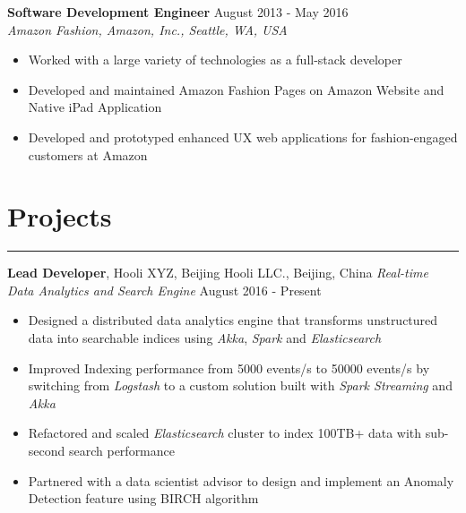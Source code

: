 \documentclass[line]{res} %
\begin{document}
\begin{resume}
    \textbf{Software Development Engineer}
    \hfill August 2013 - May 2016 \\
    \textit{Amazon Fashion, Amazon, Inc., Seattle, WA, USA}
    \begin{itemize} \itemsep -2pt  %
      \item Worked with a large variety of technologies as a full-stack developer
      \item Developed and maintained Amazon Fashion Pages on Amazon Website and Native iPad Application
      \item Developed and prototyped enhanced UX web applications for fashion-engaged customers at Amazon
    \end{itemize}


  \section{Projects}
  \rule{\textwidth}{1pt}
    \textbf{Lead Developer}, Hooli XYZ, Beijing Hooli LLC., Beijing, China
    \textit{Real-time Data Analytics and Search Engine}
    \hfill August 2016 - Present \\
    \begin{itemize} \itemsep -2pt
      \item Designed a distributed data analytics engine that transforms unstructured data into searchable 
      indices using \textit{Akka}, \textit{Spark} and \textit{Elasticsearch}
      \item Improved Indexing performance from 5000 events/s to 50000 events/s by switching from \textit{Logstash}
      to a custom solution built with \textit{Spark Streaming} and \textit{Akka}
      \item Refactored and scaled \textit{Elasticsearch} cluster to index 100TB+ data with sub-second search performance
      \item Partnered with a data scientist advisor to design and implement an Anomaly Detection feature using BIRCH algorithm
    \end{itemize}
    


\end{resume}
\end{document}
